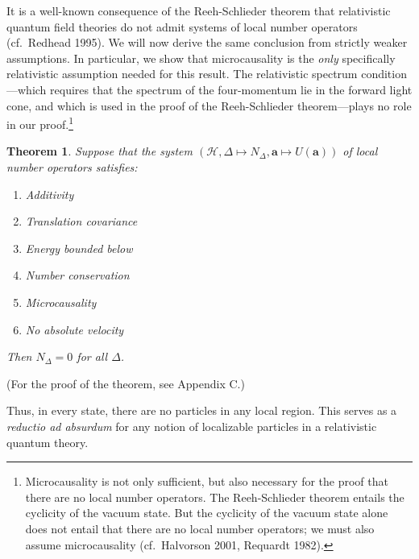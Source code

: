 \documentclass[11pt]{article}
\newtheorem{thm}{Theorem}
\theoremstyle{remark}
\newcommand{\hil}[1]{\mathcal{#1}}
\begin{document}
It is a well-known consequence of the Reeh-Schlieder theorem that
relativistic quantum field theories do not admit systems of local
number operators (cf.~Redhead 1995).  We will now derive the same
conclusion from strictly weaker assumptions.  In particular, we show
that microcausality is the \emph{only} specifically relativistic
assumption needed for this result.  The relativistic spectrum
condition---which requires that the spectrum of the four-momentum lie
in the forward light cone, and which is used in the proof of the
Reeh-Schlieder theorem---plays no role in our
proof.\footnote{Microcausality is not only sufficient, but also
  necessary for the proof that there are no local number operators.
  The Reeh-Schlieder theorem entails the cyclicity of the vacuum
  state.  But the cyclicity of the vacuum state alone does not entail
  that there are no local number operators; we must also assume
  microcausality (cf.~Halvorson 2001, Requardt 1982).}

\begin{thm} Suppose that the system $(\hil{H},\Delta \mapsto
  N_{\Delta},\mathbf{a}\mapsto U(\mathbf{a}))$ of local number
  operators satisfies:
 \begin{enumerate}
  \item Additivity
  \item Translation covariance \label{numbercovariance}
   \item Energy bounded below 
  \item Number conservation \label{numberconservation}
 \item Microcausality
 \item No absolute velocity
\end{enumerate}
Then $N_{\Delta}=0$ for all $\Delta$.  \label{rqft} \end{thm}
\noindent (For the proof of the theorem, see Appendix C.)  

Thus, in every state, there are no particles in any local region.
This serves as a \emph{reductio ad absurdum} for any notion of
localizable particles in a relativistic quantum theory.
\end{document}

